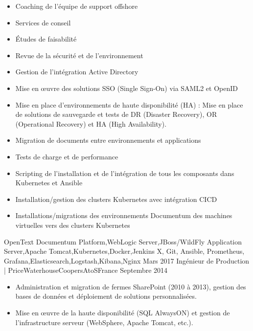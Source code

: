\begin{experiences}
{\begin{itemize}
                        \item Coaching de l’équipe de support offshore
                        \item Services de conseil           
                        \item Études de faisabilité
                        \item Revue de la sécurité et de l'environnement
                        \item Gestion de l'intégration Active Directory
                        \item Mise en œuvre des solutions SSO (Single Sign-On) via SAML2 et OpenID
                        \item Mise en place d'environnements de haute disponibilité (HA) : Mise en place de solutions de sauvegarde et tests de DR (Disaster Recovery), OR (Operational Recovery) et HA (High Availability).
                        \item Migration de documents entre environnements et applications
                        \item Tests de charge et de performance
                        \item Scripting de l'installation et de l'intégration de tous les composants dans Kubernetes et Ansible
                        \item Installation/gestion des clusters Kubernetes avec intégration CICD      
                        \item Installations/migrations des environnements Documentum des machines virtuelles vers des clusters Kubernetes                                             
                      \end{itemize}
                    }
                    {OpenText Documentum Platform,WebLogic Server,JBoss/WildFly Application Server,Apache Tomcat,Kubernetes,Docker,Jenkins X, Git, Ansible, Prometheus, Grafana,Elasticsearch,Logstash,Kibana,Nginx}
  \emptySeparator
  \experience
    {Mars 2017}     {Ingénieur de Production | PriceWaterhouseCoopers}{AtoS}{France}
    {Septembre 2014}    {
                      \begin{itemize}
                        \item Administration et migration de fermes SharePoint (2010 à 2013), gestion des bases de données et déploiement de solutions personnalisées.
                        \item Mise en œuvre de la haute disponibilité (SQL AlwaysON) et gestion de l'infrastructure serveur (WebSphere, Apache Tomcat, etc.).                

\end{itemize}}
\end{experiences}
